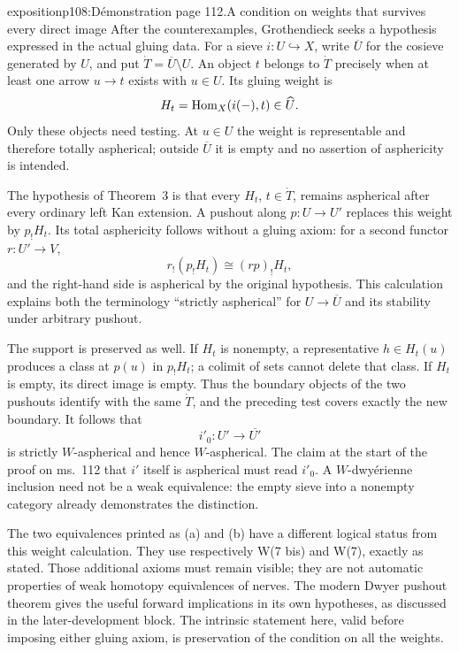 \begin{dcomment}{exposition}{p108:Démonstration page 112.}{A condition on weights that survives every direct image}
After the counterexamples, Grothendieck seeks a hypothesis expressed in the actual gluing data. For a sieve $i:U\hookrightarrow X$, write $\overline U$ for the cosieve generated by $U$, and put $\dot T=\overline U\setminus U$. An object $t$ belongs to $\dot T$ precisely when at least one arrow $u\to t$ exists with $u\in U$. Its gluing weight is
\[
 H_t=\mathrm{Hom}_X(i(-),t)\in\widehat U.
\]
Only these objects need testing. At $u\in U$ the weight is representable and therefore totally aspherical; outside $\overline U$ it is empty and no assertion of asphericity is intended.

The hypothesis of Theorem~3 is that every $H_t$, $t\in\dot T$, remains aspherical after every ordinary left Kan extension. A pushout along $p:U\to U'$ replaces this weight by $p_!H_t$. Its total asphericity follows without a gluing axiom: for a second functor $r:U'\to V$,
\[
 r_!(p_!H_t)\cong(rp)_!H_t,
\]
and the right-hand side is aspherical by the original hypothesis. This calculation explains both the terminology ``strictly aspherical'' for $U\to\overline U$ and its stability under arbitrary pushout.

The support is preserved as well. If $H_t$ is nonempty, a representative $h\in H_t(u)$ produces a class at $p(u)$ in $p_!H_t$; a colimit of sets cannot delete that class. If $H_t$ is empty, its direct image is empty. Thus the boundary objects of the two pushouts identify with the same $\dot T$, and the preceding test covers exactly the new boundary. It follows that
\[
 i'_0:U'\longrightarrow\overline{U'}
\]
is strictly $W$-aspherical and hence $W$-aspherical. The claim at the start of the proof on ms.~112 that $i'$ itself is aspherical must read $i'_0$. A $W$-dwyérienne inclusion need not be a weak equivalence: the empty sieve into a nonempty category already demonstrates the distinction.

The two equivalences printed as (a) and (b) have a different logical status from this weight calculation. They use respectively W(7 bis) and W(7), exactly as stated. Those additional axioms must remain visible; they are not automatic properties of weak homotopy equivalences of nerves. The modern Dwyer pushout theorem gives the useful forward implications in its own hypotheses, as discussed in the later-development block. The intrinsic statement here, valid before imposing either gluing axiom, is preservation of the condition on all the weights.
\end{dcomment}



